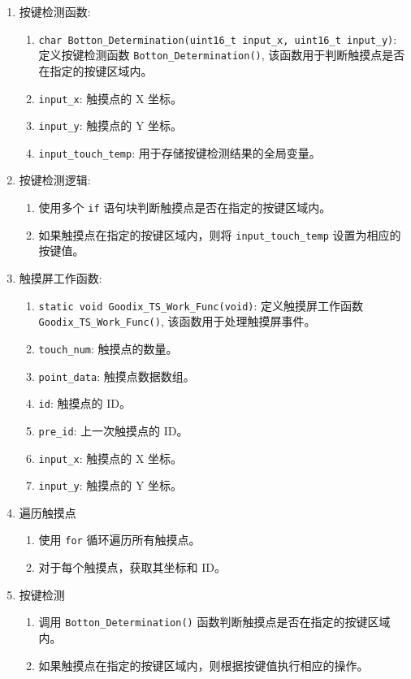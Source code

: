 \documentclass{theme-2639013-final}
\begin{document}
\begin{enumerate}
  \item 按键检测函数:
    \begin{enumerate}
      \item \texttt{char Botton\_Determination(uint16\_t input\_x, uint16\_t input\_y)}: 定义按键检测函数 \texttt{Botton\_Determination()}, 该函数用于判断触摸点是否在指定的按键区域内。
      \item \texttt{input\_x}: 触摸点的 X 坐标。
      \item \texttt{input\_y}: 触摸点的 Y 坐标。
      \item \texttt{input\_touch\_temp}: 用于存储按键检测结果的全局变量。
    \end{enumerate}

  \item 按键检测逻辑:
    \begin{enumerate}
      \item 使用多个 \texttt{if} 语句块判断触摸点是否在指定的按键区域内。
      \item 如果触摸点在指定的按键区域内，则将 \texttt{input\_touch\_temp} 设置为相应的按键值。
    \end{enumerate}

  \item 触摸屏工作函数:
    \begin{enumerate}
      \item \texttt{static void Goodix\_TS\_Work\_Func(void)}: 定义触摸屏工作函数 \texttt{Goodix\_TS\_Work\_Func()}, 该函数用于处理触摸屏事件。
      \item \texttt{touch\_num}: 触摸点的数量。
      \item \texttt{point\_data}: 触摸点数据数组。
      \item \texttt{id}: 触摸点的 ID。
      \item \texttt{pre\_id}: 上一次触摸点的 ID。
      \item \texttt{input\_x}: 触摸点的 X 坐标。
      \item \texttt{input\_y}: 触摸点的 Y 坐标。
    \end{enumerate}

  \item 遍历触摸点
    \begin{enumerate}
      \item 使用 \texttt{for} 循环遍历所有触摸点。
      \item 对于每个触摸点，获取其坐标和 ID。
    \end{enumerate}

  \item 按键检测
    \begin{enumerate}
      \item 调用 \texttt{Botton\_Determination()} 函数判断触摸点是否在指定的按键区域内。
      \item 如果触摸点在指定的按键区域内，则根据按键值执行相应的操作。
    \end{enumerate}
\end{enumerate}
\end{document}
